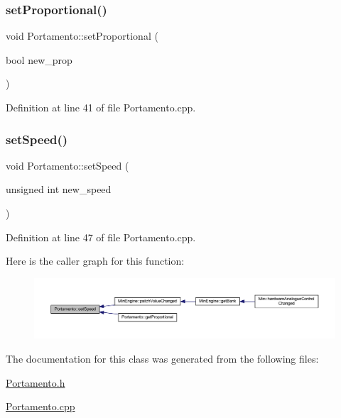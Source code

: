 \subsubsection{\texorpdfstring{set\+Proportional()}{setProportional()}}
{\footnotesize\ttfamily void Portamento\+::set\+Proportional (\begin{DoxyParamCaption}\item[{bool}]{new\+\_\+prop }\end{DoxyParamCaption})}



Definition at line 41 of file Portamento.\+cpp.

\mbox{\label{class_portamento_ac30ccb23ee5bc0dd6bb00215eb9f0805}} 
\subsubsection{\texorpdfstring{set\+Speed()}{setSpeed()}}
{\footnotesize\ttfamily void Portamento\+::set\+Speed (\begin{DoxyParamCaption}\item[{unsigned int}]{new\+\_\+speed }\end{DoxyParamCaption})}



Definition at line 47 of file Portamento.\+cpp.

Here is the caller graph for this function\+:
\nopagebreak
\begin{figure}[H]
\begin{center}
\leavevmode
\includegraphics[width=350pt]{d4/d10/class_portamento_ac30ccb23ee5bc0dd6bb00215eb9f0805_icgraph}
\end{center}
\end{figure}


The documentation for this class was generated from the following files\+:\begin{DoxyCompactItemize}
\item 
\hyperlink{_portamento_8h}{Portamento.\+h}\item 
\hyperlink{_portamento_8cpp}{Portamento.\+cpp}\end{DoxyCompactItemize}
